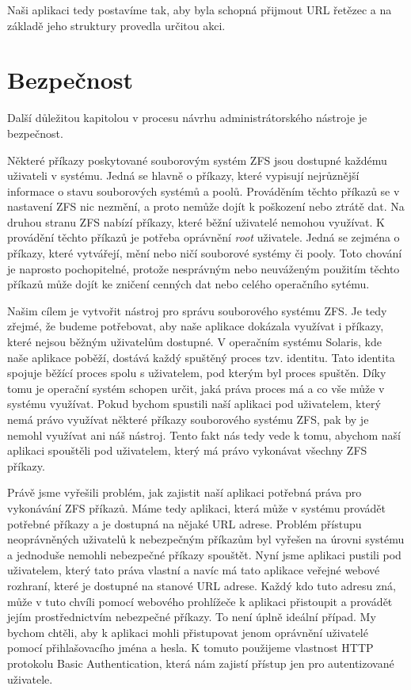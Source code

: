 Naši aplikaci tedy postavíme tak, aby byla schopná přijmout URL řetězec a na základě jeho struktury provedla určitou akci.

\section{Bezpečnost}
Další důležitou kapitolou v procesu návrhu administrátorského nástroje je bezpečnost.

Některé příkazy poskytované souborovým systém ZFS jsou dostupné každému uživateli v systému. Jedná se hlavně o příkazy, které vypisují nejrůznější informace o stavu souborových systémů a poolů. Prováděním těchto příkazů se v nastavení ZFS nic nezmění, a proto nemůže dojít k poškození nebo ztrátě dat. Na druhou stranu ZFS nabízí příkazy, které běžní uživatelé nemohou využívat. K provádění těchto příkazů je potřeba oprávnění \emph{root} uživatele. Jedná se zejména o příkazy, které vytvářejí, mění nebo ničí souborové systémy či pooly. Toto chování je naprosto pochopitelné, protože nesprávným nebo neuváženým použitím těchto příkazů může dojít ke zničení cenných dat nebo celého operačního sytému.

Našim cílem je vytvořit nástroj pro správu souborového systému ZFS. Je tedy zřejmé, že budeme potřebovat, aby naše aplikace dokázala využívat i příkazy, které nejsou běžným uživatelům dostupné. V operačním systému Solaris, kde naše aplikace poběží, dostává každý spuštěný proces tzv. identitu. Tato identita spojuje běžící proces spolu s uživatelem, pod kterým byl proces spuštěn. Díky tomu je operační systém schopen určit, jaká práva proces má a co vše může v systému využívat. Pokud bychom spustili naší aplikaci pod uživatelem, který nemá právo využívat některé příkazy souborového systému ZFS, pak by je nemohl využívat ani náš nástroj. Tento fakt nás tedy vede k tomu, abychom naší aplikaci spouštěli pod uživatelem, který má právo vykonávat všechny ZFS příkazy.

Právě jsme vyřešili problém, jak zajistit naší aplikaci potřebná práva pro vykonávání ZFS příkazů. Máme tedy aplikaci, která může v systému provádět potřebné příkazy a je dostupná na nějaké URL adrese. Problém přístupu neoprávněných uživatelů k nebezpečným příkazům byl vyřešen na úrovni systému a jednoduše nemohli nebezpečné příkazy spouštět. Nyní jsme aplikaci pustili pod uživatelem, který tato práva vlastní a navíc má tato aplikace veřejné webové rozhraní, které je dostupné na stanové URL adrese. Každý kdo tuto adresu zná, může v tuto chvíli pomocí webového prohlížeče k aplikaci přistoupit a provádět jejím prostřednictvím nebezpečné příkazy. To není úplně ideální případ. My bychom chtěli, aby k aplikaci mohli přistupovat jenom oprávnění uživatelé pomocí přihlašovacího jména a hesla. K tomuto použijeme vlastnost HTTP protokolu Basic Authentication, která nám zajistí přístup jen pro autentizované uživatele.


